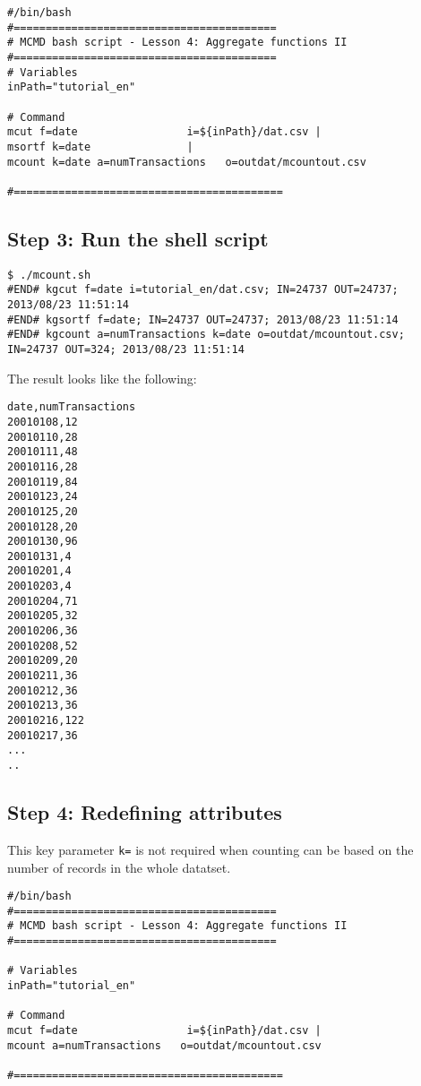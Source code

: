 \begin{verbatim}
#/bin/bash
#=========================================
# MCMD bash script - Lesson 4: Aggregate functions II
#=========================================
# Variables
inPath="tutorial_en"

# Command 
mcut f=date			     	i=${inPath}/dat.csv |
msortf k=date				|
mcount k=date a=numTransactions   o=outdat/mcountout.csv

#==========================================
\end{verbatim}

\subsection{Step 3: Run the shell script }

\begin{verbatim}
$ ./mcount.sh
#END# kgcut f=date i=tutorial_en/dat.csv; IN=24737 OUT=24737; 2013/08/23 11:51:14
#END# kgsortf f=date; IN=24737 OUT=24737; 2013/08/23 11:51:14
#END# kgcount a=numTransactions k=date o=outdat/mcountout.csv; IN=24737 OUT=324; 2013/08/23 11:51:14
\end{verbatim}

\noindent
The result looks like the following: 

\begin{verbatim}
date,numTransactions
20010108,12
20010110,28
20010111,48
20010116,28
20010119,84
20010123,24
20010125,20
20010128,20
20010130,96
20010131,4
20010201,4
20010203,4
20010204,71
20010205,32
20010206,36
20010208,52
20010209,20
20010211,36
20010212,36
20010213,36
20010216,122
20010217,36
...
..
\end{verbatim}

\subsection{Step 4: Redefining attributes }

\noindent
This key parameter \verb|k=|  is not required when counting can be based on the number of records in the whole datatset. \\

\begin{verbatim}
#/bin/bash
#=========================================
# MCMD bash script - Lesson 4: Aggregate functions II
#=========================================

# Variables
inPath="tutorial_en"

# Command 
mcut f=date			     	i=${inPath}/dat.csv |
mcount a=numTransactions   o=outdat/mcountout.csv

#==========================================
\end{verbatim}

